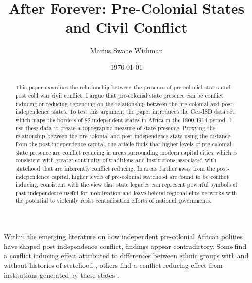 \documentclass[12pt]{article}
\title{After Forever: Pre-Colonial States and Civil Conflict}
\author[$\dagger$]{Marius Swane Wishman}
\affil[$\dagger$]{Department of Sociology and Political Science, NTNU}
\date{\today}
\begin{document}
\maketitle


\begin{abstract}


This paper examines the relationship between the presence of pre-colonial states
and post cold war civil conflict. I argue that pre-colonial state presence can
be conflict inducing or reducing depending on the relationship between the
pre-colonial and post-independence states. To test this argument the paper
introduces the Geo-ISD data set, which maps the borders of 82 independent states
in Africa in the 1800-1914 period. I use these data to create a topographic
measure of state presence. Proxying the relationship between the pre-colonial
and post-independence state using the distance from the post-independence
capital, the article finds that higher levels of pre-colonial state presence are
conflict reducing in areas surrounding modern capital cities, which is
consistent with greater continuity of traditions and institutions associated
with statehood that are inherently conflict reducing. In areas further away from
the post-independence capital, higher levels of pre-colonial statehood are found
to be conflict inducing, consistent with the view that state legacies can
represent powerful symbols of past independence useful for mobilization and
leave behind regional elite networks with the potential to violently resist
centralisation efforts of national governments. 

\end{abstract}

\clearpage


Within the emerging literature on how independent pre-colonial African polities
have shaped post independence conflict, findings appear contradictory. Some
find a conflict inducing effect attributed to differences between ethnic groups with
and without histories of statehood \citep{Englebert2002, Paine2019}, others find
a conflict reducing effect from institutions generated by these states
\citep{Depetris-Chauvin2016, Wig2016}.
\end{document}
